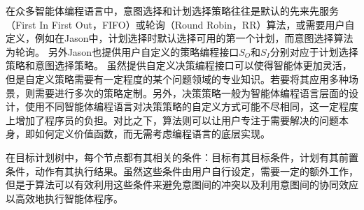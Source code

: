 %
在众多智能体编程语言中，意图选择和计划选择策略往往是默认的先来先服务（First In First Out，FIFO）或轮询（Round Robin，RR）算法，或需要用户自定义，例如在Jason\cite{bordini2007programming}中，计划选择时默认选择可用的第一个计划，而意图选择算法为轮询。
%
另外Jason也提供用户自定义的策略编程接口$S_O$和$S_I$分别对应于计划选择策略和意图选择策略。
虽然提供自定义决策编程接口可以使得智能体更加灵活，但是自定义策略需要有一定程度的某个问题领域的专业知识。若要将其应用多种场景，则需要进行多次的策略定制。另外，决策策略一般为智能体编程语言层面的设计，使用不同智能体编程语言对决策策略的自定义方式可能不尽相同，这一定程度上增加了程序员的负担。对比之下，\SA 算法则可以让用户专注于需要解决的问题本身，即如何定义价值函数，而无需考虑编程语言的底层实现。

%
在目标计划树中，每个节点都有其相关的条件：目标有其目标条件，计划有其前置条件，动作有其执行结果。虽然这些条件由用户自行设定，需要一定的额外工作，但是于\SA 算法可以有效利用这些条件来避免意图间的冲突以及利用意图间的协同效应以高效地执行智能体程序。
